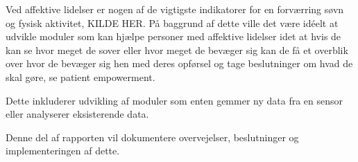 Ved affektive lidelser er nogen af de vigtigste indikatorer for en forværring søvn og fysisk aktivitet, KILDE HER.  
På baggrund af dette ville det være idéelt at udvikle moduler som kan hjælpe personer med affektive lidelser idet at hvis de kan se hvor meget de sover eller hvor meget de bevæger sig kan de få et overblik over hvor de bevæger sig hen med deres opførsel og tage beslutninger om hvad de skal gøre, se patient empowerment. 

Dette inkluderer udvikling af moduler som enten gemmer ny data fra en sensor eller analyserer eksisterende data.

Denne del af rapporten vil dokumentere overvejelser, beslutninger og implementeringen af dette.